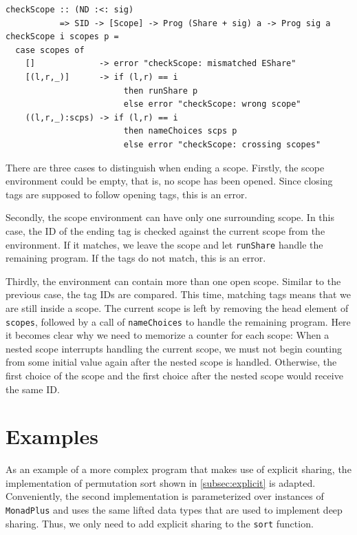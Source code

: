 \documentclass[a4paper, 11pt, fleqn, twoside, abstract=on]{scrreprt}
\newcommand{\hinl}[1]{\texttt{#1}}
\begin{document}
\begin{verbatim}
checkScope :: (ND :<: sig)
           => SID -> [Scope] -> Prog (Share + sig) a -> Prog sig a
checkScope i scopes p =
  case scopes of
    []             -> error "checkScope: mismatched EShare"
    [(l,r,_)]      -> if (l,r) == i
                        then runShare p
                        else error "checkScope: wrong scope"
    ((l,r,_):scps) -> if (l,r) == i
                        then nameChoices scps p
                        else error "checkScope: crossing scopes"
\end{verbatim}

There are three cases to distinguish when ending a scope.
Firstly, the scope environment could be empty, that is, no scope has been opened.
Since closing tags are supposed to follow opening tags, this is an error.

Secondly, the scope environment can have only one surrounding scope.
In this case, the ID of the ending tag is checked against the current scope from the environment.
If it matches, we leave the scope and let \hinl{runShare} handle the remaining program.
If the tags do not match, this is an error.

Thirdly, the environment can contain more than one open scope.
Similar to the previous case, the tag IDs are compared.
This time, matching tags means that we are still inside a scope.
The current scope is left by removing the head element of \hinl{scopes}, followed by a call of \hinl{nameChoices} to handle the remaining program.
Here it becomes clear why we need to memorize a counter for each scope: When a nested scope interrupts handling the current scope, we must not begin counting from some initial value again after the nested scope is handled.
Otherwise, the first choice of the scope and the first choice after the nested scope would receive the same ID.

\section{Examples}

As an example of a more complex program that makes use of explicit sharing, the implementation of permutation sort shown in \autoref{subsec:explicit} is adapted.
Conveniently, the second implementation is parameterized over instances of \hinl{MonadPlus} and uses the same lifted data types that are used to implement deep sharing.
Thus, we only need to add explicit sharing to the \hinl{sort} function.
\end{document}
